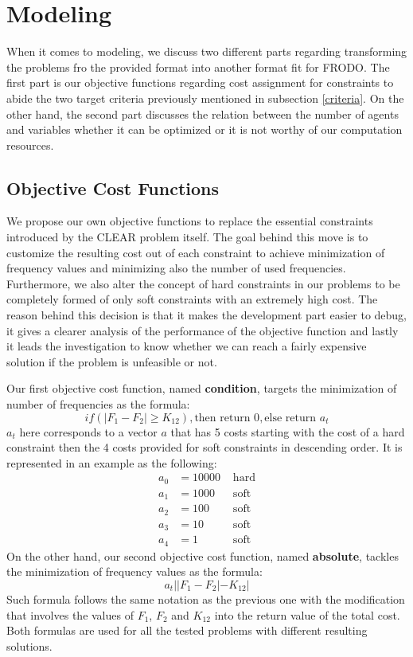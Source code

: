 \documentclass{article}
\begin{document}
	\section{Modeling}
	When it comes to modeling, we discuss two different parts regarding transforming the problems fro the provided format into another format fit for FRODO. The first part is our objective functions regarding cost assignment for constraints to abide the two target criteria previously mentioned in subsection \ref{criteria}. On the other hand, the second part discusses the relation between the number of agents and variables whether it can be optimized or it is not worthy of our computation resources.
	\subsection{Objective Cost Functions}\label{costfun}
	We propose our own objective functions to replace the essential constraints introduced by the CLEAR problem itself. The goal behind this move is to customize the resulting cost out of each constraint to achieve minimization of frequency values and minimizing also the number of used frequencies. Furthermore, we also alter the concept of hard constraints in our problems to be completely formed of only soft constraints with an extremely high cost. The reason behind this decision is that it makes the development part easier to debug, it gives a clearer analysis of the performance of the objective function and lastly it leads the investigation to know whether we can reach a fairly expensive solution if the problem is unfeasible or not.
	
	Our first objective cost function, named \textbf{condition}, targets the minimization of number of frequencies as the formula:
	\[if(|F_1 - F_2| \geq K_{12}), \text{then return 0}, \text{else return } a_t\]
	$a_t$ here corresponds to a vector $a$ that has 5 costs starting with the cost of a hard constraint then the 4 costs provided for soft constraints in descending order. It is represented in an example as the following:
	\begin{align}
		a_0 &= 10000 &\text{ hard}\\
		a_1 &= 1000 &\text{ soft}\\
		a_2 &= 100 &\text{ soft}\\
		a_3 &= 10 &\text{ soft}\\
		a_4 &= 1 &\text{ soft}
	\end{align}
	On the other hand, our second objective cost function, named \textbf{absolute}, tackles the minimization of frequency values as the formula:
	\[a_t||F_1 - F_2| - K_{12}|\]
	Such formula follows the same notation as the previous one with the modification that involves the values of $F_1$, $F_2$ and $K_{12}$ into the return value of the total cost. Both formulas are used for all the tested problems with different resulting solutions.
\end{document}
